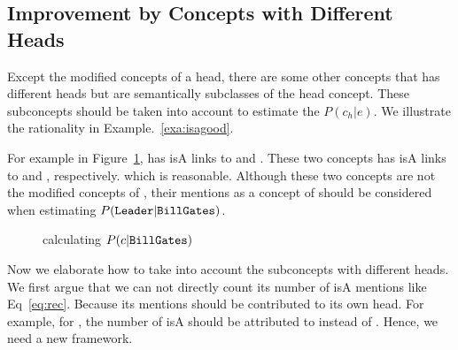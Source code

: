 \subsection{Improvement by Concepts with Different Heads}
Except the modified concepts of a head, there are some other concepts that has different heads but  are semantically subclasses of the head concept. These subconcepts should be taken into account to estimate the ${P}(c_h|e)$.  We illustrate the rationality in Example.~\ref{exa:isagood}.

\begin{example}
\label{exa:isagood}
For example in Figure~\ref{fig:pgge},  has isA links to  and . These two concepts has isA links to  and , respectively.  which is reasonable. Although these two concepts are not the modified concepts of , their mentions as a concept of   should be considered when estimating $P(\at{Leader}|\at{Bill Gates})$.
\end{example}

\begin{figure}[!hptb]
\label{fig:pgge}
\centering
{}%
\caption{calculating $P({c}|{\tt Bill Gates})$ }
\end{figure}

%
Now we elaborate how to take into account the subconcepts with different heads. We first argue that we can not directly count its number of isA mentions like Eq~\ref{eq:rec}. Because its mentions should be contributed to its own head. For example, for , the number of  isA  should be attributed to  instead of .
Hence, we need a new framework.

